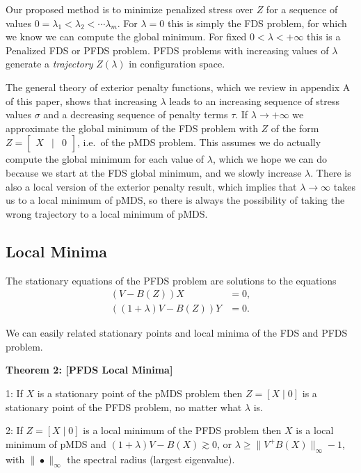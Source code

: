 \documentclass[
  12pt,
]{article}
\begin{document}
Our proposed method is to minimize penalized stress over \(Z\) for a
sequence of values \(0=\lambda_1<\lambda_2<\cdots\lambda_m\). For
\(\lambda=0\) this is simply the FDS problem, for which we know we can
compute the global minimum. For fixed \(0<\lambda<+\infty\) this is a
Penalized FDS or PFDS problem. PFDS problems with increasing values of
\(\lambda\) generate a \emph{trajectory} \(Z(\lambda)\) in configuration
space.

The general theory of exterior penalty functions, which we review in
appendix A of this paper, shows that increasing \(\lambda\) leads to an
increasing sequence of stress values \(\sigma\) and a decreasing
sequence of penalty terms \(\tau\). If \(\lambda\rightarrow+\infty\) we
approximate the global minimum of the FDS problem with \(Z\) of the form
\(Z=\begin{bmatrix}X&\mid&0\end{bmatrix}\), i.e.~of the pMDS problem.
This assumes we do actually compute the global minimum for each value of
\(\lambda\), which we hope we can do because we start at the FDS global
minimum, and we slowly increase \(\lambda\). There is also a local
version of the exterior penalty result, which implies that
\(\lambda\rightarrow\infty\) takes us to a local minimum of pMDS, so
there is always the possibility of taking the wrong trajectory to a
local minimum of pMDS.

\hypertarget{local-minima}{%
\subsection{Local Minima}\label{local-minima}}

The stationary equations of the PFDS problem are solutions to the
equations \begin{align}
(V-B(Z))X&=0,\\
((1+\lambda)V-B(Z))Y&=0.
\end{align}

We can easily related stationary points and local minima of the FDS and
PFDS problem.

\textbf{Theorem 2: {[}PFDS Local Minima{]}}

1: If \(X\) is a stationary point of the pMDS problem then
\(Z=[X\mid 0]\) is a stationary point of the PFDS problem, no matter
what \(\lambda\) is.

2: If \(Z=[X\mid 0]\) is a local minimum of the PFDS problem then \(X\)
is a local minimum of pMDS and \((1+\lambda)V-B(X)\gtrsim 0\), or
\(\lambda\geq\|V^+B(X)\|_\infty-1\), with \(\|\bullet\|_\infty\) the
spectral radius (largest eigenvalue).
\end{document}
